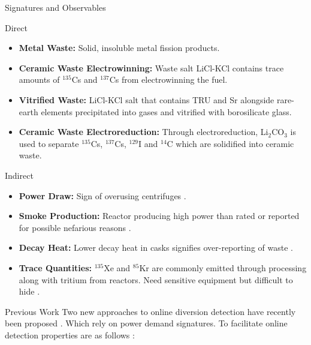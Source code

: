 \documentclass[final]{beamer}
\newlength{\onecolwid}
\newlength{\threecolwid}
\begin{document}
\begin{frame}[t]
\begin{columns}[t,totalwidth=\threecolwid]
\begin{column}{\onecolwid}
\begin{block}{Signatures and Observables}
\begin{block}{Direct}	
	\begin{itemize}
		\item \textbf{Metal Waste:} Solid, insoluble metal fission products.
		\item \textbf{Ceramic Waste Electrowinning:} Waste salt LiCl-KCl contains trace amounts of $^{135}$Cs and $^{137}$Cs from
		electrowinning the fuel.
		\item \textbf{Vitrified Waste:} LiCl-KCl salt that contains TRU and Sr alongside rare-earth elements precipitated into gases
		and vitrified with borosilicate glass.
		\item \textbf{Ceramic Waste Electroreduction:} Through electroreduction, Li$_2$CO$_3$ is used to separate $^{135}$Cs, $^{137}$Cs, 
		$^{129}$I and $^{14}$C which are solidified into ceramic waste.
	\end{itemize}
\end{block}
\begin{block}{Indirect}		
	\begin{itemize}
		\item \textbf{Power Draw:} Sign of overusing centrifuges \cite{Yilmaz_2016,Hou_2016}.
		\item \textbf{Smoke Production:} Reactor producing high power than rated or reported for possible
		nefarious reasons \cite{Yilmaz_2016}.
		\item \textbf{Decay Heat:} Lower decay heat in casks signifies over-reporting of waste \cite{Kemp_2016}.
		\item \textbf{Trace Quantities:} $^{135}$Xe and $^{85}$Kr are commonly emitted through processing along with tritium
		from reactors. Need sensitive equipment but difficult to hide \cite{Borrelli_2017,Kemp_2016}.
	\end{itemize}
\end{block}
\end{block}

    

\begin{block}{Previous Work}
Two new approaches to online diversion detection have recently been proposed \cite{Hou_2016,Yilmaz_2016}. Which rely on  power demand signatures. To facilitate online detection properties are as follows \cite{Yilmaz_2016}:


\end{block}
\end{column}
\end{columns}
\end{frame}
\end{document}
